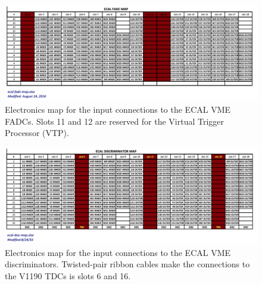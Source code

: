 \documentclass[letterpaper,10pt]{article}
\begin{document}
\begin{figure}
  \hspace{1cm}
  \includegraphics[width=9in]{ecal-fadc-map}
  \caption{Electronics map for the input connections to the ECAL VME FADCs. Slots 11 and 12 are
  reserved for the Virtual Trigger Processor (VTP).}
  \label{ecal-fadc-map}
\end{figure}

\begin{figure}
  \hspace{1cm}
  \includegraphics[width=9in]{ecal-disc-map}
  \caption{Electronics map for the input connections to the ECAL VME discriminators.  Twisted-pair ribbon
  cables make the connections to the V1190 TDCs is slots 6 and 16.}
  \label{ecal-disc-map}
\end{figure}
\end{document}
